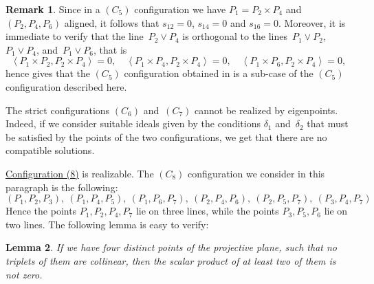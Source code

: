 \documentclass[a4paper, 11pt, reqno]{amsart}
\theoremstyle{plain}
\newtheorem{lemma}{Lemma}[section]
\theoremstyle{definition}
\newtheorem{rmk}[lemma]{Remark}
\newcommand{\scl}[2]{\left\langle {#1}, {#2} \right\rangle}
\begin{document}
\begin{rmk}
Since in a $(C_5)$ configuration we have 
$P_1 = P_2 \times P_4$ and $(P_2, P_4, P_6)$ aligned, it follows that $s_{12} = 0$,  $s_{14} = 0$ and $s_{16} = 0$.
Moreover, it is
immediate to verify that the line~$P_2 \vee P_4$ is orthogonal to the
lines~$P_1 \vee P_2$, $P_1 \vee P_4$, and~$P_1 \vee P_6$, that is
%
\[
  \scl{P_1 \times P_2}{P_2 \times P_4} = 0, \quad
  \scl{P_1 \times P_4}{P_2 \times P_4} = 0, \quad
  \scl{P_1 \times P_6}{P_2 \times P_4} = 0,
\]
hence  gives that the $(C_5)$ configuration obtained in  is a sub-case of the $(C_5)$ configuration described here.
%
\end{rmk}
%


The strict configurations $(C_6)$ and~$(C_7)$ cannot be realized by eigenpoints.
Indeed, if we consider suitable ideals given by the conditions
$\delta_1$ and~$\delta_2$ that must be satisfied by the points of the two configurations,
we get that there are no compatible solutions.

\underline{Configuration (8)} is realizable.  
The $(C_8)$ configuration we consider in this paragraph is the following: 
%
\begin{equation}
\label{config:c8}
(P_1, P_2, P_3), \ (P_1, P_4, P_5), \ (P_1, P_6, P_7), \ (P_2, P_4, P_6), \ 
(P_2, P_5, P_7), \ (P_3, P_4, P_7)    
\end{equation}
%
Hence the points $P_1, P_2, P_4, P_7$ lie on three lines, while the points
$P_3, P_5, P_6$ lie on two lines.
The following lemma is easy to verify:

\begin{lemma}
\label{lemma:6ortog} If we have four distinct points of the projective
plane, such that no triplets of them are collinear, then the scalar 
product of at least two of them is not zero.
\end{lemma}
\end{document}
